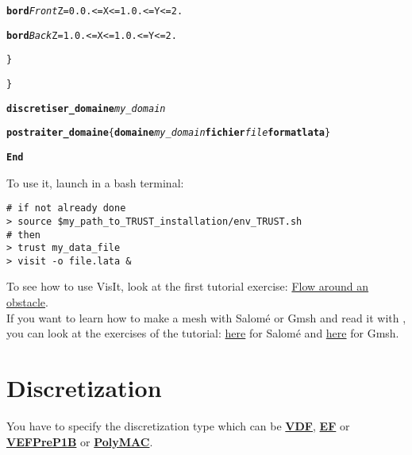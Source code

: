 \begin{center}
{\begin{minipage}[c]{0.8\textwidth}
\begin{alltt}
\hspace{2cm}        {\bf{bord}} \textit{Front}  \hspace{0.25cm} Z = 0. 0. <= X <= 1.  0. <= Y <= 2.

\hspace{2cm}        {\bf{bord}} \textit{Back}   \hspace{0.45cm} Z = 1. 0. <= X <= 1.  0. <= Y <= 2.

\hspace{1cm}    \}

\}

{\bf{discretiser\_domaine}} \textit{my\_domain}

{\bf{postraiter\_domaine}} \{ {\bf{domaine}} \textit{my\_domain} {\bf{fichier}} \textit{file} {\bf{format lata}} \}

{\bf{End}}
    \end{alltt}
\end{minipage}}
\end{center}

To use it, launch in a bash terminal:
\begin{verbatim}
# if not already done
> source $my_path_to_TRUST_installation/env_TRUST.sh
# then
> trust my_data_file
> visit -o file.lata &
\end{verbatim}

To see how to use VisIt, look at the first \trust tutorial exercise: \href{TRUST_tutorial.pdf\#exo1}{Flow around an obstacle}.\\

If you want to learn how to make a mesh with Salom\'e or Gmsh and read it with \trust, you can look at the exercises of the \trust tutorial: \href{TRUST_tutorial.pdf\#salome}{here} for Salom\'e and \href{TRUST_tutorial.pdf\#gmsh}{here} for Gmsh.







\section{Discretization}
You have to specify the discretization type which can be \href{\REFERENCEMANUAL\#vdf}{\textbf{VDF}}, \href{\REFERENCEMANUAL\#ef}{\textbf{EF}} or \href{\REFERENCEMANUAL\#vefprep1b}{\textbf{VEFPreP1B}} or \href{\REFERENCEMANUAL\#polymac}{\textbf{PolyMAC}}.\\

